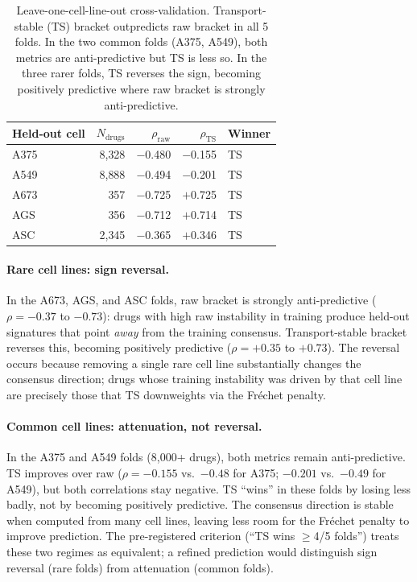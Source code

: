 \documentclass{article}
\begin{document}
\begin{table}[t]
\centering
\caption{Leave-one-cell-line-out cross-validation. Transport-stable (TS)
bracket outpredicts raw bracket in all 5 folds. In the two common folds
(A375, A549), both metrics are anti-predictive but TS is less so.
In the three rarer folds, TS reverses the sign, becoming positively
predictive where raw bracket is strongly anti-predictive.}
\label{tab:transport}
\small
\begin{tabular}{lrrrl}
\toprule
Held-out cell & $N_{\text{drugs}}$ & $\rho_{\text{raw}}$ & $\rho_{\text{TS}}$ & Winner \\
\midrule
A375 & 8{,}328 & $-$0.480 & $-$0.155 & TS \\
A549 & 8{,}888 & $-$0.494 & $-$0.201 & TS \\
A673 & 357 & $-$0.725 & $+$0.725 & TS \\
AGS & 356 & $-$0.712 & $+$0.714 & TS \\
ASC & 2{,}345 & $-$0.365 & $+$0.346 & TS \\
\bottomrule
\end{tabular}
\end{table}

\paragraph{Rare cell lines: sign reversal.}
In the A673, AGS, and ASC folds, raw bracket is strongly anti-predictive
($\rho = -0.37$ to $-0.73$): drugs with high raw instability in training
produce held-out signatures that point \emph{away} from the training
consensus. Transport-stable bracket reverses this, becoming positively
predictive ($\rho = +0.35$ to $+0.73$). The reversal occurs because
removing a single rare cell line substantially changes the consensus
direction; drugs whose training instability was driven by that cell line
are precisely those that TS downweights via the Fr\'{e}chet penalty.

\paragraph{Common cell lines: attenuation, not reversal.}
In the A375 and A549 folds (8{,}000+ drugs), both metrics remain
anti-predictive. TS improves over raw ($\rho = -0.155$ vs.\ $-0.48$ for
A375; $-0.201$ vs.\ $-0.49$ for A549), but both correlations stay
negative. TS ``wins'' in these folds by losing less badly, not by becoming
positively predictive. The consensus direction is stable when computed from
many cell lines, leaving less room for the Fr\'{e}chet penalty to
improve prediction. The pre-registered criterion (``TS wins $\geq$4/5
folds'') treats these two regimes as equivalent; a refined prediction
would distinguish sign reversal (rare folds) from attenuation (common
folds).
\end{document}
